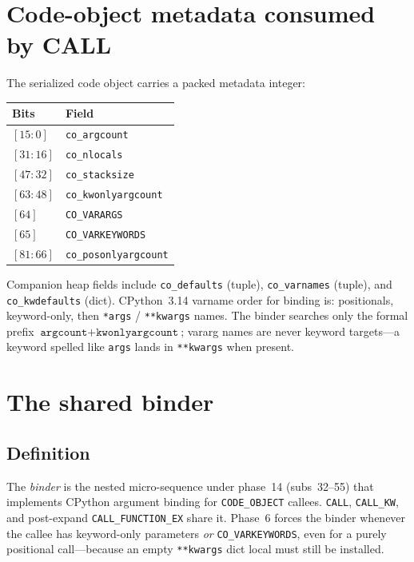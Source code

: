\documentclass[11pt,a4paper]{article}
\begin{document}
\section{Code-object metadata consumed by CALL}

The serialized code object carries a packed metadata integer:

\begin{center}
\begin{tabular}{@{}lp{}@{}}
\toprule
Bits & Field \\
\midrule
$[15:0]$ & \texttt{co\_argcount} \\
$[31:16]$ & \texttt{co\_nlocals} \\
$[47:32]$ & \texttt{co\_stacksize} \\
$[63:48]$ & \texttt{co\_kwonlyargcount} \\
$[64]$ & \texttt{CO\_VARARGS} \\
$[65]$ & \texttt{CO\_VARKEYWORDS} \\
$[81:66]$ & \texttt{co\_posonlyargcount} \\
\bottomrule
\end{tabular}
\end{center}

Companion heap fields include \texttt{co\_defaults} (tuple),
\texttt{co\_varnames} (tuple), and \texttt{co\_kwdefaults} (dict).
CPython~3.14 varname order for binding is: positionals, keyword-only, then
\texttt{*args} / \texttt{**kwargs} names.
The binder searches only the formal prefix
$\texttt{argcount}+\texttt{kwonlyargcount}$; vararg names are never keyword
targets---a keyword spelled like \texttt{args} lands in \texttt{**kwargs} when
present.

\section{The shared binder}

\subsection{Definition}
The \emph{binder} is the nested micro-sequence under phase~14 (subs~32--55) that
implements CPython argument binding for \texttt{CODE\_OBJECT} callees.
\texttt{CALL}, \texttt{CALL\_KW}, and post-expand \texttt{CALL\_FUNCTION\_EX}
share it.
Phase~6 forces the binder whenever the callee has keyword-only parameters
\emph{or} \texttt{CO\_VARKEYWORDS}, even for a purely positional call---because
an empty \texttt{**kwargs} dict local must still be installed.
\end{document}
